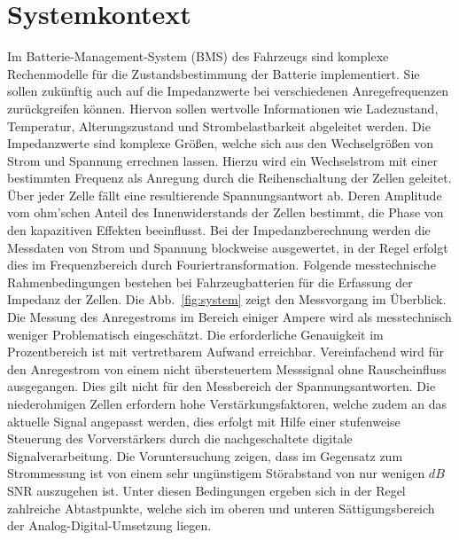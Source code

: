 \section{Systemkontext}
Im Batterie-Management-System (BMS)  des Fahrzeugs sind komplexe Rechenmodelle für die Zustandsbestimmung der Batterie implementiert. Sie sollen zukünftig auch auf die Impedanzwerte bei verschiedenen Anregefrequenzen zurückgreifen können. Hiervon sollen wertvolle Informationen wie Ladezustand, Temperatur, Alterungszustand und Strombelastbarkeit abgeleitet werden. Die Impedanzwerte sind komplexe Größen, welche sich aus den Wechselgrößen von Strom und Spannung errechnen lassen. Hierzu wird ein Wechselstrom mit einer bestimmten Frequenz als Anregung durch die Reihenschaltung der Zellen geleitet. Über jeder Zelle fällt eine resultierende Spannungsantwort ab. Deren Amplitude vom ohm'schen Anteil des Innenwiderstands der Zellen bestimmt, die Phase von den kapazitiven Effekten beeinflusst.
Bei der Impedanzberechnung werden die Messdaten von Strom und Spannung blockweise ausgewertet, in der Regel erfolgt dies im Frequenzbereich durch Fouriertransformation. Folgende messtechnische Rahmenbedingungen bestehen bei Fahrzeugbatterien für die Erfassung der Impedanz der Zellen. Die Abb.~\ref{fig:system} zeigt den Messvorgang im Überblick. Die Messung des Anregestroms im Bereich einiger Ampere wird als messtechnisch weniger Problematisch eingeschätzt. Die erforderliche Genauigkeit im Prozentbereich ist mit vertretbarem Aufwand erreichbar. Vereinfachend wird für den Anregestrom von einem nicht übersteuertem Messsignal ohne Rauscheinfluss ausgegangen. Dies gilt nicht für den Messbereich der Spannungsantworten. Die niederohmigen Zellen erfordern hohe Verstärkungsfaktoren, welche zudem an das aktuelle Signal angepasst werden, dies erfolgt mit Hilfe einer stufenweise Steuerung des Vorverstärkers durch die nachgeschaltete digitale Signalverarbeitung. Die Voruntersuchung zeigen, dass im Gegensatz zum Strommessung ist von einem sehr ungünstigem Störabstand von nur wenigen $dB$ SNR auszugehen ist. Unter diesen Bedingungen ergeben sich in der Regel zahlreiche Abtastpunkte, welche sich im oberen und unteren Sättigungsbereich der Analog-Digital-Umsetzung liegen.

